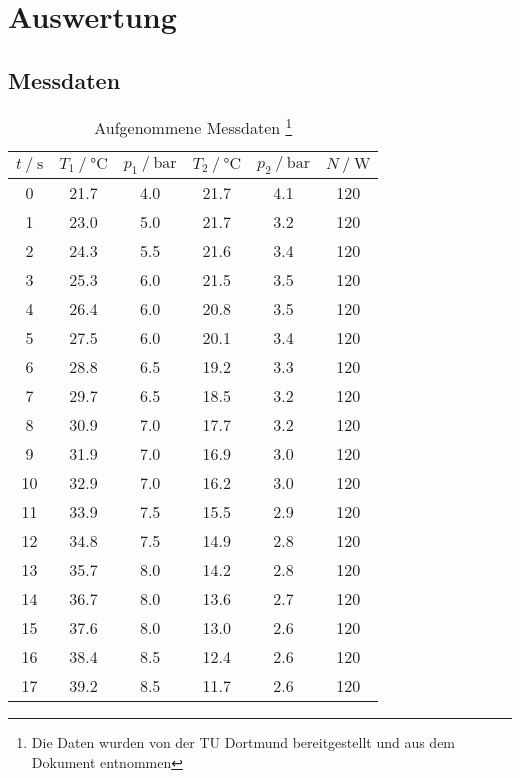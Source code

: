 \section{Auswertung}
\label{sec:Auswertung}
\subsection{Messdaten}
\begin{table}
  \centering
  \label{Aufgenommene Messdaten}
  \caption{Aufgenommene Messdaten \footnote{Die Daten wurden von der TU Dortmund bereitgestellt und aus dem Dokument \cite{DatenundHinweise} entnommen}}
  \begin{tabular}{S[table-format = 2.0] S[table-format = 2.1] S[table-format = 2.2] S[table-format = 2.1]
     S[table-format = 1.1] S[table-format = 3.0]}
     \toprule
     {$t \mathbin{/} \si{\second}$} & {$T_1 \mathbin{/} \si{\celsius}$} & {$p_1 \mathbin{/} \si{\bar}$} & {$T_2 \mathbin{/} \si{\celsius}$}
     & {$p_2 \mathbin{/} \si{\bar}$} & {$N \mathbin{/} \si{\watt}$} \\
     	& 21.7 &	4.0    &	21.7 & 4.1 & 120 \\
     1  & 23.0 &	5.0    &	21.7 & 3.2 & 120 \\
     2 	& 24.3 &	5.5    &	21.6 & 3.4 & 120 \\
     3 	& 25.3 &	6.0    &	21.5 & 3.5 & 120 \\
     4 	& 26.4 &	6.0    &	20.8 & 3.5 & 120 \\
     5 	& 27.5 &	6.0    &	20.1 & 3.4 & 120 \\
     6 	& 28.8 &	6.5    &	19.2 & 3.3 & 120 \\
     7 	& 29.7 &	6.5    &	18.5 & 3.2 & 120 \\
     8 	& 30.9 &	7.0    &	17.7 & 3.2 & 120 \\
     9 	& 31.9 &	7.0    &	16.9 & 3.0 & 120 \\
    10	& 32.9 &	7.0    &	16.2 & 3.0 & 120 \\
    11	& 33.9 &	7.5    &	15.5 & 2.9 & 120 \\
    12	& 34.8 &	7.5    &	14.9 & 2.8 & 120 \\
    13	& 35.7 &	8.0    &	14.2 & 2.8 & 120 \\
    14	& 36.7 &	8.0    &	13.6 & 2.7 & 120 \\
    15	& 37.6 &	8.0    &	13.0 & 2.6 & 120 \\
    16	& 38.4 &	8.5    &	12.4 & 2.6 & 120 \\
    17	& 39.2 &	8.5    &	11.7 & 2.6 & 120 \\

\end{tabular}
\end{table}
